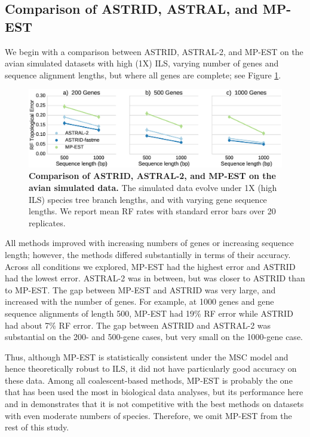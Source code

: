 \subsection{Comparison of ASTRID, ASTRAL, and MP-EST}


We begin with a comparison between ASTRID, ASTRAL-2, and MP-EST 
on the avian simulated datasets with high (1X) ILS, varying number
of genes  and sequence alignment lengths, but where
all genes are complete; see Figure \ref{astrid::fig:avian-mpest}.

\begin{figure}
  \centering
  \includegraphics[width=12cm]{astrid-figs/avian-mpest.eps}
  \caption[Comparison of ASTRID, ASTRAL-2, and MP-EST 
      on avian simulated data]{\textbf{Comparison of ASTRID, ASTRAL-2, and MP-EST 
      on the avian simulated data.} The
simulated data evolve under 1X (high ILS) species tree branch lengths,
and with
      varying gene sequence lengths.
      We report mean RF rates with standard error bars over 20
    replicates. 
}
  \label{astrid::fig:avian-mpest}
\end{figure}
All methods improved with increasing numbers of genes
or increasing sequence length; however, the methods
differed substantially in terms of their accuracy.
Across all conditions we explored,
MP-EST had the highest error 
and ASTRID had the lowest  error. 
ASTRAL-2 was in between, but was closer to ASTRID than to 
MP-EST. 
The gap between MP-EST and ASTRID was very large,
and increased with the number of genes. For example,
at 1000 genes and gene sequence alignments of length 500,
MP-EST had 19\% RF error while
ASTRID had about 7\% RF error.
The gap between ASTRID and ASTRAL-2 was substantial 
on the 200- and 500-gene cases, but very small
on the 1000-gene case. 

Thus, although MP-EST is statistically consistent
under the MSC model
and hence theoretically robust to ILS, it 
did not have particularly good accuracy on
these data. 
Among all coalescent-based methods, 
MP-EST is probably the one that has been used the
most in biological data analyses, but
its performance here and
in \cite{ASTRALII,BayzidRECOMBCG2014} demonstrates that it is not
competitive with the best methods on  datasets
with even moderate numbers
of species. 
Therefore, we omit MP-EST from the rest of
this study.




